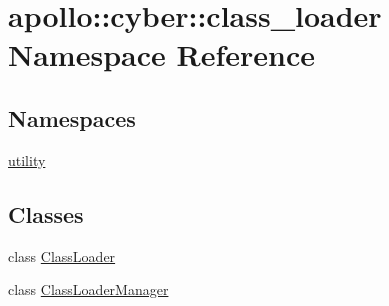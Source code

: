 \hypertarget{namespaceapollo_1_1cyber_1_1class__loader}{\section{apollo\-:\-:cyber\-:\-:class\-\_\-loader Namespace Reference}
\label{namespaceapollo_1_1cyber_1_1class__loader}
}
\subsection*{Namespaces}
\begin{DoxyCompactItemize}
\item 
\hyperlink{namespaceapollo_1_1cyber_1_1class__loader_1_1utility}{utility}
\end{DoxyCompactItemize}
\subsection*{Classes}
\begin{DoxyCompactItemize}
\item 
class \hyperlink{classapollo_1_1cyber_1_1class__loader_1_1ClassLoader}{Class\-Loader}
\item 
class \hyperlink{classapollo_1_1cyber_1_1class__loader_1_1ClassLoaderManager}{Class\-Loader\-Manager}
\end{DoxyCompactItemize}
